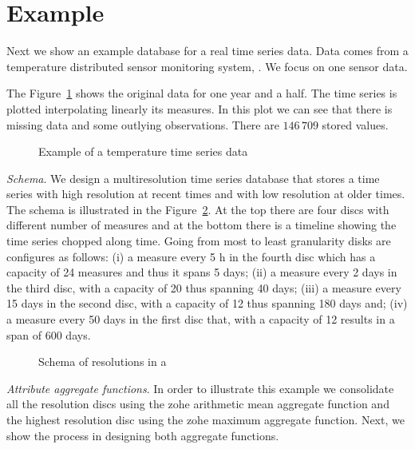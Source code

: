 \section{Example}
\label{sec:example}

Next we show an example database for a real time series data.  Data
comes from a temperature distributed sensor monitoring system,
\cite{alippi10}. We focus on one sensor data.

The Figure~\ref{fig:exemple:original} shows the original data for one
year and a half.  The time series is plotted interpolating linearly
its measures. In this plot we can see that there is missing data and
some outlying observations. There are $146\,709$ stored values.

\begin{figure}[tp]
  \centering
  
  \caption{Example of a temperature time series data}
  \label{fig:exemple:original}
\end{figure}

\emph{Schema}. We design a multiresolution time series database that
stores a time series with high resolution at recent times and with low
resolution at older times. The schema is illustrated in the
Figure~\ref{fig:exemple:window}. At the top there are four discs with
different number of measures and at the bottom there is a timeline
showing the time series chopped along time. Going from most to least
granularity disks are configures as follows: (i) a measure every 5 h
in the fourth disc which has a capacity of 24 measures and thus it
spans 5 days; (ii) a measure every 2 days in the third disc, with a
capacity of 20 thus spanning 40 days; (iii) a measure every 15 days in
the second disc, with a capacity of 12 thus spanning 180 days and;
(iv) a measure every 50 days in the first disc that, with a capacity
of 12 results in a span of 600 days.

\begin{figure}[tp]
  \centering
  \setlength{\unitlength}{1.3mm}
  
  \caption{Schema of resolutions in a }
  \label{fig:exemple:window}
\end{figure}

\emph{Attribute aggregate functions}.  In order to illustrate this
example we consolidate all the resolution discs using the zohe
arithmetic mean aggregate function and the highest resolution disc
using the zohe maximum aggregate function. Next, we show the process
in designing both aggregate functions.

